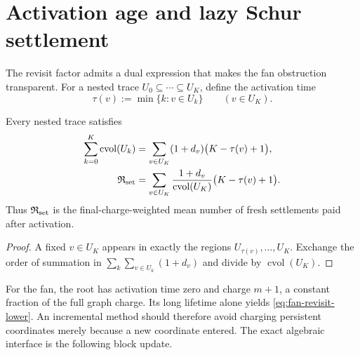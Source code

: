 \section{Activation age and lazy Schur settlement}
\label{sec:lazy-schur}

The revisit factor admits a dual expression that makes the fan obstruction
transparent.  For a nested trace
$U_0\subseteq\cdots\subseteq U_K$, define the activation time
\begin{equation}
 \tau(v):=\min\{k:v\in U_k\}
 \qquad(v\in U_K).
 \label{eq:activation-time}
\end{equation}

\begin{proposition}
\label{prop:activation-age}
Every nested trace satisfies
\begin{align}
 \sum_{k=0}^K\operatorname{cvol}(U_k)
 &=
 \sum_{v\in U_K}(1+d_v)\bigl(K-\tau(v)+1\bigr),
 \label{eq:activation-age-sum}\\
 \mathfrak R_{\rm set}
 &=
 \sum_{v\in U_K}
 \frac{1+d_v}{\operatorname{cvol}(U_K)}
 \bigl(K-\tau(v)+1\bigr).
 \label{eq:activation-age-mean}
\end{align}
Thus $\mathfrak R_{\rm set}$ is the final-charge-weighted mean number of
fresh settlements paid after activation.
\end{proposition}

\begin{proof}
A fixed $v\in U_K$ appears in exactly the regions
$U_{\tau(v)},\ldots,U_K$.  Exchange the order of summation in
$\sum_k\sum_{v\in U_k}(1+d_v)$ and divide by
$\operatorname{cvol}(U_K)$.
\end{proof}

For the fan, the root has activation time zero and charge $m+1$, a constant
fraction of the full graph charge.  Its long lifetime alone yields
\cref{eq:fan-revisit-lower}.  An incremental method should therefore avoid
charging persistent coordinates merely because a new coordinate entered.
The exact algebraic interface is the following block update.

